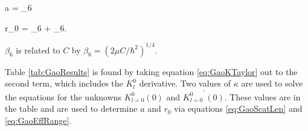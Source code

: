 \documentclass[Dissertation.tex]{subfiles}
\begin{document}
\beq
\label{eq:GaoScatLen}
a =   \beta_6
\eeq

\beq
\label{eq:GaoEffRange}
r_0 =   \beta_6 +   \beta_6.
\eeq

\noindent $\beta_6$ is related to $C$ by $\beta_6 = (2\mu C/\hbar^2)^{1/4}$.

Table \ref{tab:GaoResults} is found by taking equation \ref{eq:GaoKTaylor} out to the second term, which includes the $K_l^0$ derivative. Two values of $\kappa$ are used to solve the equations for the unknowns $K_{l=0}^0(0)$ and ${K_{l=0}^0}^\prime(0)$. These values are in the table and are used to determine $a$ and $r_0$ via equations \ref{eq:GaoScatLen} and \ref{eq:GaoEffRange}.
\end{document}
